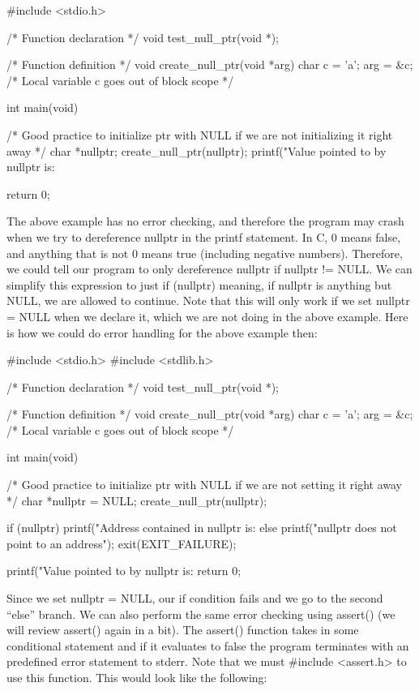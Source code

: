 \documentclass{article}
\begin{document}
\begin{cblk}
#include <stdio.h>

/* Function declaration */
void test_null_ptr(void *);

/* Function definition */
void create_null_ptr(void *arg) {
   char c = 'a';
   arg = &c;
} /* Local variable c goes out of block scope */

int main(void) {
    /*
        Good practice to initialize ptr with NULL
        if we are not initializing it right away
    */
    char *nullptr;
    create_null_ptr(nullptr);
    printf("Value pointed to by nullptr is: %

    return 0;
}
\end{cblk}

The above example has no error checking, and therefore the program may crash when we try to dereference
nullptr in the printf statement. In C, 0 means false, and anything that is not 0 means true (including
negative numbers). Therefore, we could tell our program to only dereference nullptr if nullptr != NULL. We
can simplify this expression to just if (nullptr) meaning, if nullptr is anything but NULL, we are allowed to
continue. Note that this will only work if we set nullptr = NULL when we declare it, which we are not doing
in the above example. Here is how we could do error handling for the above example then:

\begin{cblk}
#include <stdio.h>
#include <stdlib.h>

/* Function declaration */
void test_null_ptr(void *);

/* Function definition */
void create_null_ptr(void *arg) {
   char c = 'a';
   arg = &c;
} /* Local variable c goes out of block scope */

int main(void) {
   /* Good practice to initialize ptr with NULL
      if we are not setting it right away */
   char *nullptr = NULL;
   create_null_ptr(nullptr);

   if (nullptr) {
      printf("Address contained in nullptr is: %
   } else {
        printf("nullptr does not point to an address\n");
        exit(EXIT_FAILURE);
    }

   printf("Value pointed to by nullptr is: %
   return 0;
}
\end{cblk}

Since we set nullptr = NULL, our if condition fails and we go to the second “else” branch. We can also
perform the same error checking using assert() (we will review assert() again in a bit). The assert()
function takes in some conditional statement and if it evaluates to false the program terminates with an
predefined error statement to stderr. Note that we must #include <assert.h> to use this function. This would
look like the following:
\end{document}
